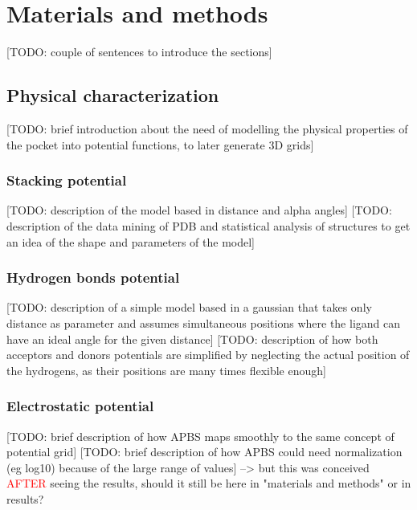 \chapter{Materials and methods} %

[TODO: couple of sentences to introduce the sections]

\section{Physical characterization}
  [TODO: brief introduction about the need of modelling the physical properties of the pocket into potential functions, to later generate 3D grids]

  \subsection{Stacking potential}
    [TODO: description of the model based in distance and alpha angles]
    [TODO: description of the data mining of PDB and statistical analysis of structures to get an idea of the shape and parameters of the model]

  \subsection{Hydrogen bonds potential}
    [TODO: description of a simple model based in a gaussian that takes only distance as parameter and assumes simultaneous positions where the ligand can have an ideal angle for the given distance]
    [TODO: description of how both acceptors and donors potentials are simplified by neglecting the actual position of the hydrogens, as their positions are many times flexible enough]

  \subsection{Electrostatic potential}
    [TODO: brief description of how APBS maps smoothly to the same concept of potential grid]
    [TODO: brief description of how APBS could need normalization (eg log10) because of the large range of values] --> but this was conceived
    \textcolor{red}{AFTER} seeing the results, should it still be here in "materials and methods" or in results?

